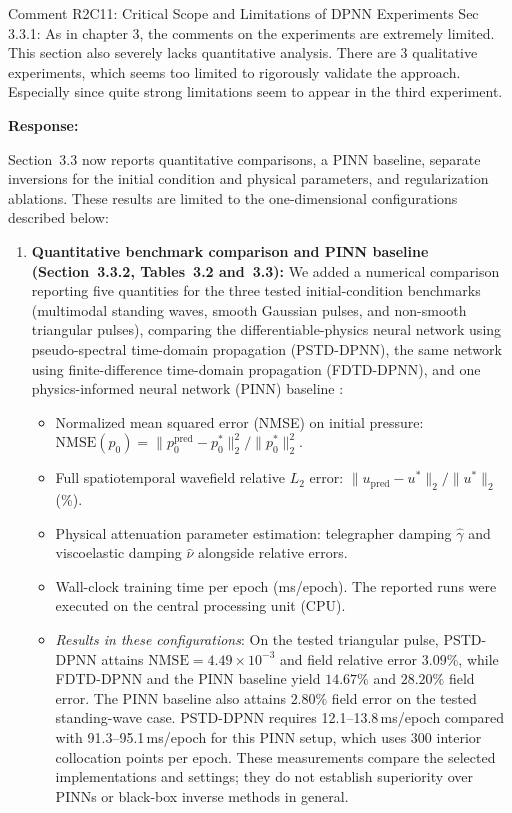 \documentclass[11pt,a4paper]{article}
\newenvironment{response}{
    \par\vspace{1mm}\noindent\textbf{\textcolor{responseframe}{Response:}}\par\vspace{1mm}
}{
    \par\vspace{3mm}
}
\begin{document}
\begin{revcomment}{Comment R2C11: Critical Scope and Limitations of DPNN Experiments}
Sec 3.3.1: As in chapter 3, the comments on the experiments are extremely limited. This section also severely lacks quantitative analysis. There are 3 qualitative experiments, which seems too limited to rigorously validate the approach. Especially since quite strong limitations seem to appear in the third experiment.
\end{revcomment}

\begin{response}
Section~3.3 now reports quantitative comparisons, a PINN baseline, separate inversions for the initial condition and physical parameters, and regularization ablations. These results are limited to the one-dimensional configurations described below:
\begin{enumerate}
    \item \textbf{Quantitative benchmark comparison and PINN baseline (Section~3.3.2, Tables~3.2 and~3.3):} We added a numerical comparison reporting five quantities for the three tested initial-condition benchmarks (multimodal standing waves, smooth Gaussian pulses, and non-smooth triangular pulses), comparing the differentiable-physics neural network using pseudo-spectral time-domain propagation (PSTD-DPNN), the same network using finite-difference time-domain propagation (FDTD-DPNN), and one physics-informed neural network (PINN) baseline \citep{raissi_pinn_2019,haghighat_sciann_2021}:
    \begin{itemize}
        \item Normalized mean squared error (NMSE) on initial pressure: $\mathrm{NMSE}(p_0) = \|p_0^{\mathrm{pred}} - p_0^*\|_2^2 / \|p_0^*\|_2^2$.
        \item Full spatiotemporal wavefield relative $L_2$ error: $\|u_{\mathrm{pred}} - u^*\|_2 / \|u^*\|_2$ (\%).
        \item Physical attenuation parameter estimation: telegrapher damping $\hat{\gamma}$ and viscoelastic damping $\hat{\nu}$ alongside relative errors.
        \item Wall-clock training time per epoch (ms/epoch). The reported runs were executed on the central processing unit (CPU).
        \item \emph{Results in these configurations}: On the tested triangular pulse, PSTD-DPNN attains $\mathrm{NMSE}=4.49\times10^{-3}$ and field relative error $3.09\%$, while FDTD-DPNN and the PINN baseline yield $14.67\%$ and $28.20\%$ field error. The PINN baseline also attains $2.80\%$ field error on the tested standing-wave case. PSTD-DPNN requires 12.1--13.8\,ms/epoch compared with 91.3--95.1\,ms/epoch for this PINN setup, which uses 300 interior collocation points per epoch. These measurements compare the selected implementations and settings; they do not establish superiority over PINNs or black-box inverse methods in general.

\end{itemize}
\end{enumerate}
\end{response}
\end{document}

